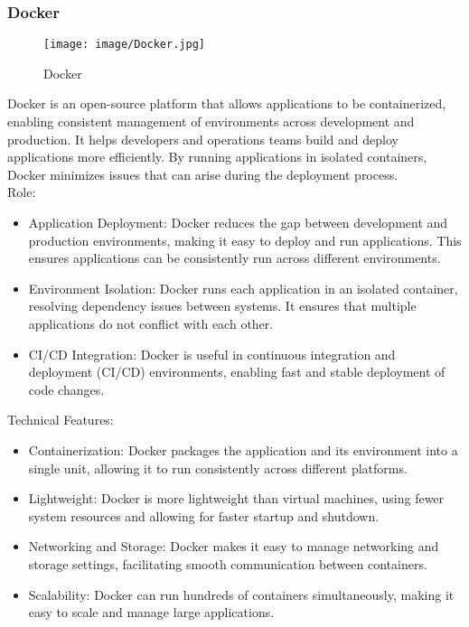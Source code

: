 \documentclass[conference]{IEEEtran}
\begin{document}
\subsubsection{Docker}

\begin{figure}[h!]
    \centering
    \texttt{[image: image/Docker.jpg]}
    \caption{Docker}
    \label{fig:enter-label}
\end{figure}

\noindent Docker is an open-source platform that allows applications to be containerized, enabling consistent management of environments across development and production. It helps developers and operations teams build and deploy applications more efficiently. By running applications in isolated containers, Docker minimizes issues that can arise during the deployment process.\\

Role:
\begin{itemize}
    \item Application Deployment: Docker reduces the gap between development and production environments, making it easy to deploy and run applications. This ensures applications can be consistently run across different environments.\\
    \item Environment Isolation: Docker runs each application in an isolated container, resolving dependency issues between systems. It ensures that multiple applications do not conflict with each other.\\
    \item CI/CD Integration: Docker is useful in continuous integration and deployment (CI/CD) environments, enabling fast and stable deployment of code changes.\\
\end{itemize}

Technical Features:
\begin{itemize}
    \item Containerization: Docker packages the application and its environment into a single unit, allowing it to run consistently across different platforms.\\
    \item Lightweight: Docker is more lightweight than virtual machines, using fewer system resources and allowing for faster startup and shutdown.\\
    \item Networking and Storage: Docker makes it easy to manage networking and storage settings, facilitating smooth communication between containers.\\
    \item Scalability: Docker can run hundreds of containers simultaneously, making it easy to scale and manage large applications.\\
\end{itemize}
\end{document}
